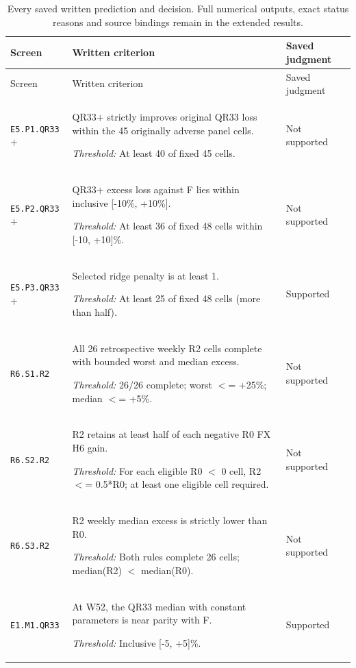 \documentclass[10pt,a4paper]{article}
\begin{document}
{\footnotesize
\begin{longtable}{p{2.0cm}p{10.5cm}p{2.5cm}}
\caption{Every saved written prediction and decision. Full numerical outputs, exact status reasons and source bindings remain in the extended results.}\label{tab:submission-predictions}\\
\toprule Screen & Written criterion & Saved judgment\\\midrule\endfirsthead
\toprule Screen & Written criterion & Saved judgment\\\midrule\endhead
\texttt{E5.\allowbreak{}P1.\allowbreak{}QR33\ensuremath{+}} & QR33+ strictly improves original QR33 loss within the 45 originally adverse panel cells.\par\emph{Threshold:} At least 40 of fixed 45 cells. & Not supported \\[3pt]
\texttt{E5.\allowbreak{}P2.\allowbreak{}QR33\ensuremath{+}} & QR33+ excess loss against F lies within inclusive [-10\%,\allowbreak{} +10\%].\par\emph{Threshold:} At least 36 of fixed 48 cells within [-10,\allowbreak{} +10]\%. & Not supported \\[3pt]
\texttt{E5.\allowbreak{}P3.\allowbreak{}QR33\ensuremath{+}} & Selected ridge penalty is at least 1.\par\emph{Threshold:} At least 25 of fixed 48 cells (more than half). & Supported \\[3pt]
\texttt{R6.\allowbreak{}S1.\allowbreak{}R2} & All 26 retrospective weekly R2 cells complete with bounded worst and median excess.\par\emph{Threshold:} 26/\allowbreak{}26 complete; worst \ensuremath{<}=\allowbreak{} +25\%; median \ensuremath{<}=\allowbreak{} +5\%. & Not supported \\[3pt]
\texttt{R6.\allowbreak{}S2.\allowbreak{}R2} & R2 retains at least half of each negative R0 FX H6 gain.\par\emph{Threshold:} For each eligible R0 \ensuremath{<} 0 cell,\allowbreak{} R2 \ensuremath{<}=\allowbreak{} 0.5*R0; at least one eligible cell required. & Not supported \\[3pt]
\texttt{R6.\allowbreak{}S3.\allowbreak{}R2} & R2 weekly median excess is strictly lower than R0.\par\emph{Threshold:} Both rules complete 26 cells; median(R2) \ensuremath{<} median(R0). & Not supported \\[3pt]
\texttt{E1.\allowbreak{}M1.\allowbreak{}QR33} & At W52, the QR33 median with constant parameters is near parity with F.\par\emph{Threshold:} Inclusive [-5,\allowbreak{} +5]\%. & Supported \\[3pt]

\end{longtable}}
\end{document}
